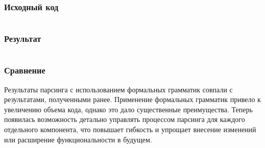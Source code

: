 \subsubsection{Исходный код}
\inputminted[breaklines]{python}{../task_4.py}

\subsubsection{Результат}
\inputminted[breaklines]{js}{../schedule_4.json}

\subsubsection{Сравнение}
Результаты парсинга с использованием формальных грамматик совпали с результатами, полученными ранее. Применение формальных грамматик привело к увеличению объема кода, однако это дало существенные преимущества. Теперь появилась возможность детально управлять процессом парсинга для каждого отдельного компонента, что повышает гибкость и упрощает внесение изменений или расширение функциональности в будущем.